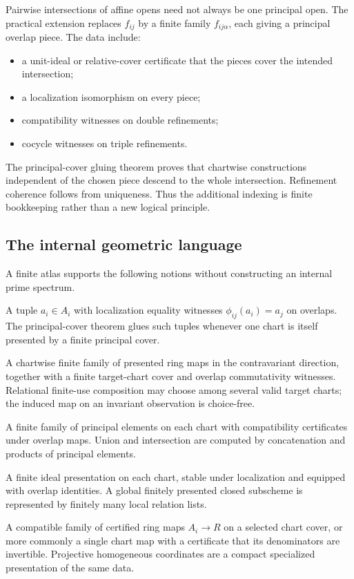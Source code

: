 Pairwise intersections of affine opens need not always be one principal open.  The practical
extension replaces $f_{ij}$ by a finite family $f_{ij\alpha}$, each giving a principal overlap piece.
The data include:

\begin{itemize}
\item a unit-ideal or relative-cover certificate that the pieces cover the intended intersection;
\item a localization isomorphism on every piece;
\item compatibility witnesses on double refinements;
\item cocycle witnesses on triple refinements.
\end{itemize}

The principal-cover gluing theorem proves that chartwise constructions independent of the chosen
piece descend to the whole intersection.  Refinement coherence follows from uniqueness.  Thus the
additional indexing is finite bookkeeping rather than a new logical principle.

\subsection{The internal geometric language}

A finite atlas supports the following notions without constructing an internal prime spectrum.

\begin{description}[style=nextline]
\item[Regular function.]
A tuple $a_i\in A_i$ with localization equality witnesses
$\phi_{ij}(a_i)=a_j$ on overlaps.  The principal-cover theorem glues such tuples whenever one chart
is itself presented by a finite principal cover.

\item[Morphism.]
A chartwise finite family of presented ring maps in the contravariant direction, together with a
finite target-chart cover and overlap commutativity witnesses.  Relational finite-use composition
may choose among several valid target charts; the induced map on an invariant observation is
choice-free.

\item[Open subobject.]
A finite family of principal elements on each chart with compatibility certificates under overlap
maps.  Union and intersection are computed by concatenation and products of principal elements.

\item[Closed subobject.]
A finite ideal presentation on each chart, stable under localization and equipped with overlap
identities.  A global finitely presented closed subscheme is represented by finitely many local
relation lists.

\item[Point over a presented ring $R$.]
A compatible family of certified ring maps $A_i\to R$ on a selected chart cover, or more commonly a
single chart map with a certificate that its denominators are invertible.  Projective homogeneous
coordinates are a compact specialized presentation of the same data.
\end{description}

